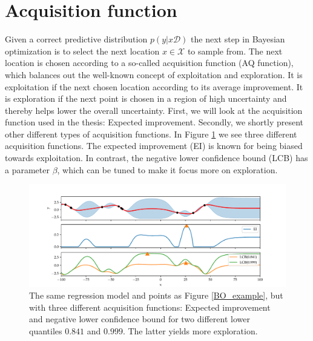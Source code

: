 \section{Acquisition function}
Given a correct predictive distribution $p(y|x\mathcal{D})$ the next step in Bayesian optimization
is to select the next location $x \in \mathcal{X}$ to sample from. The next location is chosen
according to a so-called acquisition function (AQ function), which balances out the well-known
concept of exploitation and exploration. It is exploitation if the next chosen location according to
its average improvement. It is exploration if the next point is chosen in a region of high
uncertainty and thereby helps lower the overall uncertainty. First, we will look at the acquisition
function used in the thesis: Expected improvement. Secondly, we shortly present other different
types of acquisition functions. In Figure \ref{Different_AQ_functions} we see three different
acquisition functions. The expected improvement (EI) is known for being biased towards exploitation.
In contrast, the negative lower confidence bound (LCB) has a parameter $\beta$, which can be tuned
to make it focus more on exploration. 
\begin{figure}[H]
    \centering
    \includegraphics[trim=1cm 0cm 1cm 1cm,clip,width=\textwidth]{Pictures/illustration_AQs.pdf}
    \caption{The same regression model and points as Figure \ref{BO_example}, but with three
    different acquisition functions: Expected improvement and negative lower confidence bound for
    two different lower quantiles $0.841$ and $0.999$. The latter yields more exploration.}\label{Different_AQ_functions}
\end{figure}

